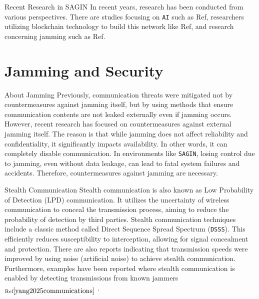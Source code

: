 \documentclass[11pt]{beamer}
\begin{document}
\begin{frame}{Recent Research in SAGIN}
  In recent years, research has been conducted from various perspectives. There are studies focusing on \texttt{AI} such as Ref\cite{wu2024towards}, researchers utilizing blockchain technology to build this network like Ref\cite{tang2022blockchain}, and research concerning jamming such as Ref\cite{han2024endogenous}.
\end{frame}

\section{Jamming and Security}

\begin{frame}{About Jamming}
  Previously, communication threats were mitigated not by countermeasures against jamming itself, but by using methods that ensure communication contents are not leaked externally even if jamming occurs. However, recent research has focused on countermeasures against external jamming itself. The reason is that while jamming does not affect reliability and confidentiality, it significantly impacts availability. In other words, it can completely disable communication. In environments like \texttt{SAGIN}, losing control due to jamming, even without data leakage, can lead to fatal system failures and accidents. Therefore, countermeasures against jamming are necessary.
\end{frame}

\begin{frame}{Stealth Communication}
  Stealth communication is also known as Low Probability of Detection (LPD) communication. It utilizes the uncertainty of wireless communication to conceal the transmission process, aiming to reduce the probability of detection by third parties. Stealth communication techniques include a classic method called Direct Sequence Spread Spectrum (\texttt{DSSS}). This efficiently reduces susceptibility to interception, allowing for signal concealment and protection. There are also reports indicating that transmission speeds were improved by using noise (artificial noise) to achieve stealth communication. Furthermore, examples have been reported where stealth communication is enabled by detecting transmissions from known jammers$_{\text{Ref}\cite{yang2025communications}}$ .
\end{frame}
\end{document}
